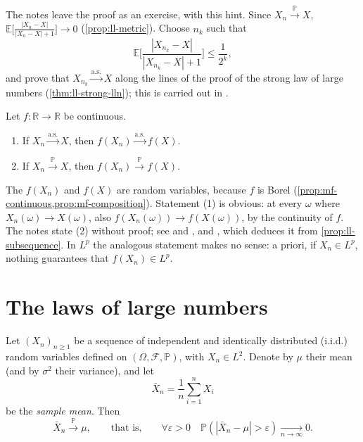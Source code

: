 The notes leave the proof as an exercise, with this hint. Since $X_n\xrightarrow{\mathbb P}X$,
$\mathbb E\big[\frac{|X_n-X|}{|X_n-X|+1}\big]\to0$ (\cref{prop:ll-metric}). Choose $n_k$ such
that
\[
  \mathbb E\bigg[\frac{|X_{n_k}-X|}{|X_{n_k}-X|+1}\bigg]\le\frac1{2^k},
\]
and prove that $X_{n_k}\xrightarrow{\text{a.s.}}X$ along the lines of the proof of the strong law
of large numbers (\cref{thm:ll-strong-lln}); this is carried out in .

\begin{proposition}[Continuity]\label{prop:ll-continuous-mapping}
Let $f:\mathbb R\to\mathbb R$ be continuous.
\begin{enumerate}[label=(\arabic*)]
  \item If $X_n\xrightarrow{\text{a.s.}}X$, then $f(X_n)\xrightarrow{\text{a.s.}}f(X)$.
  \item If $X_n\xrightarrow{\mathbb P}X$, then $f(X_n)\xrightarrow{\mathbb P}f(X)$.
\end{enumerate}
\end{proposition}

The $f(X_n)$ and $f(X)$ are random variables, because $f$ is Borel
(\cref{prop:mf-continuous,prop:mf-composition}).
Statement (1) is obvious: at every $\omega$ where $X_n(\omega)\to X(\omega)$, also
$f(X_n(\omega))\to f(X(\omega))$, by the continuity of $f$. The notes state (2) without proof; see
\citet[Section~20, ``Convergence in Probability'']{billingsley} and \citet[Section~2.3]{durrett},
and , which deduces it from \cref{prop:ll-subsequence}. In $L^p$ the
analogous statement makes no sense: a priori, if $X_n\in L^p$, nothing guarantees that
$f(X_n)\in L^p$.

\section{The laws of large numbers}\label{sec:ll-lln}

\begin{theorem}\label{thm:ll-weak-lln}
Let $(X_n)_{n\ge1}$ be a sequence of independent and identically distributed (i.i.d.) random
variables defined on $(\Omega,\mathcal F,\mathbb P)$, with $X_n\in L^2$. Denote by $\mu$ their mean
(and by $\sigma^2$ their variance), and let
\[
  \bar X_n=\frac1n\sum_{i=1}^nX_i
\]
be the \emph{sample mean}. Then
\[
  \bar X_n\xrightarrow{\mathbb P}\mu,\qquad\text{that is,}\qquad
  \forall\varepsilon>0\quad\mathbb P(|\bar X_n-\mu|>\varepsilon)\xrightarrow[n\to\infty]{}0 .
\]
\end{theorem}

